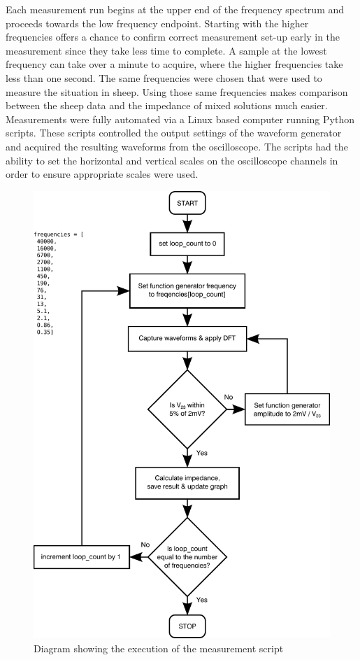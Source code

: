   Each measurement run begins at the upper end of the frequency spectrum and proceeds towards the low frequency endpoint.
  Starting with the higher frequencies offers a chance to confirm correct measurement set-up early in the measurement since they take less time to complete.
  A sample at the lowest frequency can take over a minute to acquire, where the higher frequencies take less than one second.
  The same frequencies were chosen that were used to measure the situation in sheep.
  Using those same frequencies makes comparison between the sheep data and the impedance of mixed solutions much easier.
  Measurements were fully automated via a Linux based computer running Python scripts.
  These scripts controlled the output settings of the waveform generator and acquired the resulting waveforms from the oscilloscope.
  The scripts had the ability to set the horizontal and vertical scales on the oscilloscope channels in order to ensure appropriate scales were used.
  \begin{figure}
      \centering
      \includegraphics[width=\textwidth]{content/pt2/graphics/measurementFlowchart}
      \caption{\label{fig:creatingCSF_pythonFlowchart}Diagram showing the execution of the measurement script}
  \end{figure}

